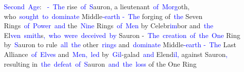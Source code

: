 \documentclass{article}
\begin{document}
\begin{tcolorbox}[colframe=black,colback=white]
{}\textcolor{blue}{Second}\textcolor{blue}{~Age}:\textcolor{blue}{~
}\textcolor{blue}{-}\textcolor{blue}{~The} rise\textcolor{blue}{~of}\textcolor{blue}{~S}auron, a lieutenant\textcolor{blue}{~of}\textcolor{blue}{~Morg}oth, who\textcolor{blue}{~sought}\textcolor{blue}{~to}\textcolor{blue}{~dominate} Middle\textcolor{blue}{-earth}\textcolor{blue}{
}\textcolor{blue}{-}\textcolor{blue}{~The} forging of\textcolor{blue}{~the} Seven Rings\textcolor{blue}{~of}\textcolor{blue}{~Power}\textcolor{blue}{~and} the\textcolor{blue}{~Nine} Rings\textcolor{blue}{~of}\textcolor{blue}{~Men} by Celebr\textcolor{blue}{im}bor and\textcolor{blue}{~the} El\textcolor{blue}{ven}\textcolor{blue}{~smith}s\textcolor{blue}{,}\textcolor{blue}{~who}\textcolor{blue}{~were}\textcolor{blue}{~deceived}\textcolor{blue}{~by} Sauron\textcolor{blue}{
}-\textcolor{blue}{~The}\textcolor{blue}{~creation}\textcolor{blue}{~of}\textcolor{blue}{~the}\textcolor{blue}{~One} Ring by\textcolor{blue}{~S}auron to rule\textcolor{blue}{~all}\textcolor{blue}{~the} other\textcolor{blue}{~rings} and\textcolor{blue}{~dominate} Middle\textcolor{blue}{-earth}\textcolor{blue}{
}\textcolor{blue}{-}\textcolor{blue}{~The} Last Alliance\textcolor{blue}{~of}\textcolor{blue}{~Elves} and\textcolor{blue}{~Men}\textcolor{blue}{,}\textcolor{blue}{~led} by\textcolor{blue}{~Gil}-galad\textcolor{blue}{~and} Elend\textcolor{blue}{il}\textcolor{blue}{,} against Sauron\textcolor{blue}{,} resulting in\textcolor{blue}{~the}\textcolor{blue}{~defeat}\textcolor{blue}{~of}\textcolor{blue}{~S}auron\textcolor{blue}{~and}\textcolor{blue}{~the}\textcolor{blue}{~loss} of the One Ring\textcolor{blue}{

}
\end{tcolorbox}
\end{document}

